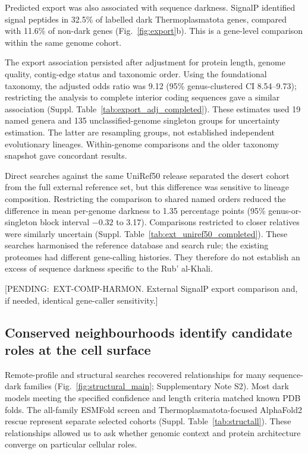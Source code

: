 \documentclass[11pt]{article}
\begin{document}
Predicted export was also associated with sequence darkness. SignalP identified signal peptides in 32.5\% of labelled dark Thermoplasmatota genes, compared with 11.6\% of non-dark genes (Fig.~\ref{fig:export}b). This is a gene-level comparison within the same genome cohort.

The export association persisted after adjustment for protein length, genome quality, contig-edge status and taxonomic order. Using the foundational taxonomy, the adjusted odds ratio was 9.12 (95\% genus-clustered CI 8.54--9.73); restricting the analysis to complete interior coding sequences gave a similar association (Suppl. Table~\ref{tab:export_adj_completed}). These estimates used 19 named genera and 135 unclassified-genome singleton groups for uncertainty estimation. The latter are resampling groups, not established independent evolutionary lineages. Within-genome comparisons and the older taxonomy snapshot gave concordant results.

Direct searches against the same UniRef50 release separated the desert cohort from the full external reference set, but this difference was sensitive to lineage composition. Restricting the comparison to shared named orders reduced the difference in mean per-genome darkness to 1.35 percentage points (95\% genus-or-singleton block interval $-0.32$ to 3.17). Comparisons restricted to closer relatives were similarly uncertain (Suppl. Table~\ref{tab:ext_uniref50_completed}). These searches harmonised the reference database and search rule; the existing proteomes had different gene-calling histories. They therefore do not establish an excess of sequence darkness specific to the Rub' al-Khali.

{\ttfamily\raggedright [PENDING:\allowbreak\ EXT-COMP-HARMON. External SignalP export comparison and, if needed, identical gene-caller sensitivity.]\par}

\subsection*{Conserved neighbourhoods identify candidate roles at the cell surface}

Remote-profile and structural searches recovered relationships for many sequence-dark families (Fig.~\ref{fig:structural_main}; Supplementary Note S2). Most dark models meeting the specified confidence and length criteria matched known PDB folds. The all-family ESMFold screen and Thermoplasmatota-focused AlphaFold2 rescue represent separate selected cohorts (Suppl. Table~\ref{tab:structall}). These relationships allowed us to ask whether genomic context and protein architecture converge on particular cellular roles.
\end{document}
